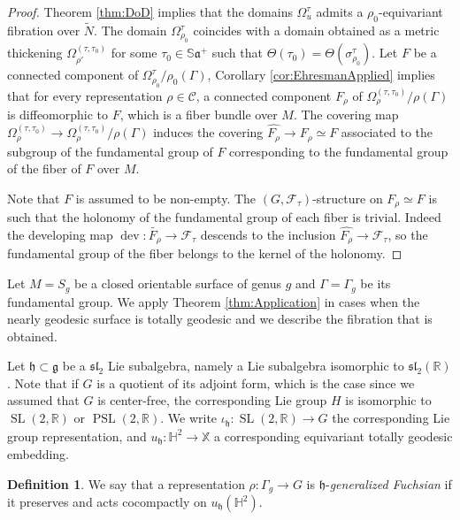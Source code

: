 \documentclass[reqno,10pt]{amsart}
\theoremstyle{plain}
\theoremstyle{definition}
\newtheorem{defn}[thm]{Definition}
\theoremstyle{remark}
\newcommand{\type}{\tau}
\newcommand{\R}{\mathbb{R}}
\newcommand{\Sph}{\mathbb{S}}
\DeclareMathOperator{\dev}{dev}
\DeclareMathOperator{\PSL}{PSL}
\DeclareMathOperator{\SL}{SL}
\newcommand{\X}{\mathbb{X}}
\newcommand{\ie}{namely }
\begin{document}
\begin{proof}
Theorem \ref{thm:DoD} implies that the domains $\Omega^\type_u$ admits a $\rho_0$-equivariant fibration over $\widetilde{N}$. The domain $\Omega_{\rho_0}^\type$ coincides with a domain obtained as a metric thickening $\Omega^{(\type,\type_0)}_{\rho'}$ for some $\type_0\in \Sph\mathfrak{a}^+$ such that $\Theta(\type_0)=\Theta(\sigma^\type_{\rho_0})$. Let $F$ be a connected component of $\Omega_{\rho_0}^\type/\rho_0(\Gamma)$, Corollary \ref{cor:EhresmanApplied} implies that for every representation $\rho\in\mathcal{C}$, a connected component $F_\rho$ of $\Omega_\rho^{(\type,\type_0)}/\rho(\Gamma)$ is diffeomorphic to $F$, which is a fiber bundle over $M$. The covering map $\Omega_\rho^{(\type,\type_0)}\to\Omega_\rho^{(\type,\type_0)}/\rho(\Gamma)$ induces the covering $\widehat{F_\rho} \to F_\rho\simeq F$ associated to the subgroup of the fundamental group of $F$ corresponding to the fundamental group of the fiber of $F$ over $M$.

\medskip

Note that $F$ is assumed to be non-empty. The $(G,\mathcal{F}_\type)$-structure on $F_\rho\simeq F$ is such that the holonomy of the fundamental group of each fiber is trivial. Indeed the developing map $\dev:\widetilde{F_\rho}\to \mathcal{F}_\type$ descends to the inclusion $\widehat{F_\rho}\to \mathcal{F}_\type$, so the fundamental group of the fiber belongs to the kernel of the holonomy.
\end{proof}

Let $M=S_g$ be a closed orientable surface of genus $g$ and $\Gamma=\Gamma_g$ be its fundamental group. We apply Theorem \ref{thm:Application} in cases when the nearly geodesic surface is totally geodesic and we describe the fibration that is obtained.

\medskip

Let $\mathfrak{h}\subset \mathfrak{g}$ be a $\mathfrak{sl}_2$ Lie subalgebra, \ie a Lie subalgebra isomorphic to $\mathfrak{sl}_2(\R)$. Note that if $G$ is a quotient of its adjoint form, which is the case since we assumed that $G$ is center-free, the corresponding Lie group $H$ is isomorphic to $\SL(2,\R)$ or $\PSL(2,\R)$. We write $\iota_\mathfrak{h}:\SL(2,\R)\to G$ the corresponding Lie group representation, and $u_\mathfrak{h}:\mathbb{H}^2\to \X$ a corresponding equivariant totally geodesic embedding. 


\begin{defn}
\label{defn:GeneralFuchs}
We say that a representation $\rho:\Gamma_g\to G$ is $\mathfrak{h}$-\emph{generalized Fuchsian} if it preserves and acts cocompactly on $u_\mathfrak{h}\left(\mathbb{H}^2\right)$. 
\end{defn}
\end{document}
